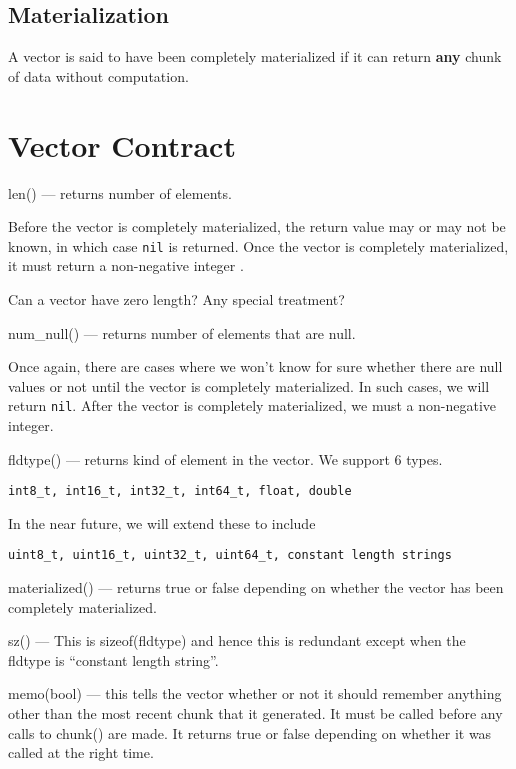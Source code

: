 \subsection{Materialization}
A vector is said to have been completely materialized if it can return {\bf any}
chunk of data without computation.


\section{Vector Contract}
\label{vector_contract}

\be
\item len() --- returns number of elements. 

Before the vector is completely materialized, the return value may or may not be
known, in which case {\tt nil} is returned.
Once the vector is completely materialized, it must return a non-negative
integer .

Can a vector have zero length? Any special treatment? \TBC
\item num\_null() --- returns number of elements that are null.

Once again, there are cases where we won't know for sure whether there are null
values or not until the vector is completely materialized. In such cases, we
will return {\tt nil}. 
After the vector is completely materialized, we must a non-negative integer.
\item fldtype() --- returns kind of element in the vector. 
We support 6 types.
\begin{center}
{\tt int8\_t, int16\_t, int32\_t, int64\_t, float, double}
\end{center}
In the near  future, we will extend these to include 
\begin{center}
{\tt uint8\_t, uint16\_t, uint32\_t, uint64\_t, constant length strings}
\end{center}
\item materialized() --- returns true or false depending on whether the vector
has been completely materialized.
\item sz() ---  This is sizeof(fldtype) and
hence this is redundant except when the fldtype is ``constant length
string''.
\item memo(bool) --- this tells the vector whether or not it should remember
anything other than the most recent chunk that it generated. It must be called
before any calls to chunk() are made. It returns true or false depending
on whether it was called at the right time. 

